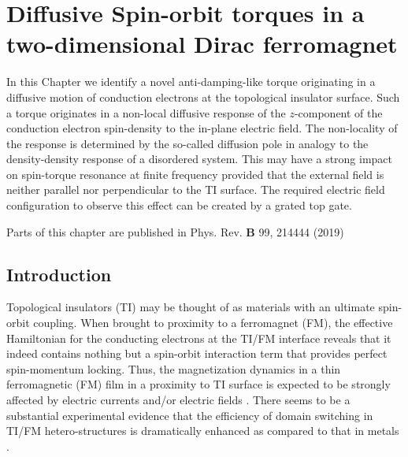\chapter{Diffusive Spin-orbit torques in a two-dimensional Dirac ferromagnet}\label{ch:diffusive}
In this Chapter we identify a novel anti-damping-like torque originating in a diffusive motion of conduction electrons at the topological insulator surface. Such a torque originates in a non-local diffusive response of the $z$-component of the conduction electron spin-density to the in-plane electric field. The non-locality of the response is determined by the so-called diffusion pole in analogy to the density-density response of a disordered system. This may have a strong impact on spin-torque resonance at finite frequency provided that the external field is neither parallel nor perpendicular to the TI surface. The required electric field configuration to observe this effect can be created by a grated top gate.

\vfill
Parts of this chapter are published in Phys. Rev. \textbf{B} 99, 214444 (2019) 
\clearpage

\section{Introduction} 
Topological insulators (TI) \cite{fu_topological_2007,moore_topological_2007,roy_topological_2009,hsieh_topological_2008} may be thought of as materials with an ultimate spin-orbit coupling. When brought to proximity to a ferromagnet (FM), the effective Hamiltonian for the conducting electrons at the TI/FM interface reveals that it indeed contains nothing but a spin-orbit interaction term that provides perfect spin-momentum locking. Thus, the magnetization dynamics in a thin ferromagnetic (FM) film in a proximity to TI surface is expected to be strongly affected by electric currents and/or electric fields \cite{qi_fractional_2008}. There seems to be a substantial experimental evidence that the efficiency of domain switching in TI/FM hetero-structures is dramatically enhanced as compared to that in metals \cite{mellnik_spin-transfer_2014,wang_SOT_BiSe_2014,fan_magnetization_2014,Fan_SOT_TI_2016,Yasuda_SOT_BiSbTe_2017,Cha2018}. 


